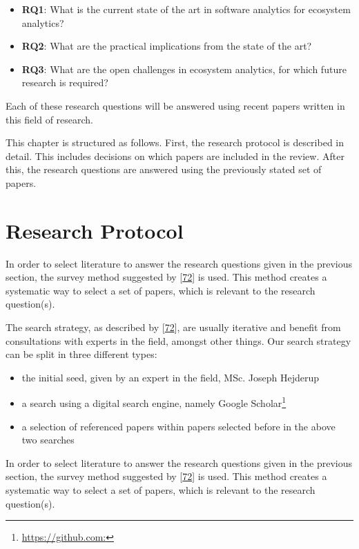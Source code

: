 \documentclass[]{book}
\providecommand{\tightlist}{%
  \setlength{\itemsep}{0pt}\setlength{\parskip}{0pt}}
\let\rmarkdownfootnote\footnote%
\def\footnote{\protect\rmarkdownfootnote}
\begin{document}
\begin{itemize}
\tightlist
\item
  \textbf{RQ1}: What is the current state of the art in software
  analytics for ecosystem analytics?
\item
  \textbf{RQ2}: What are the practical implications from the state of
  the art?
\item
  \textbf{RQ3}: What are the open challenges in ecosystem analytics, for
  which future research is required?
\end{itemize}

Each of these research questions will be answered using recent papers
written in this field of research.

This chapter is structured as follows. First, the research protocol is
described in detail. This includes decisions on which papers are
included in the review. After this, the research questions are answered
using the previously stated set of papers.

\section{Research Protocol}\label{research-protocol-2}

In order to select literature to answer the research questions given in
the previous section, the survey method suggested by
{[}\protect\hyperlink{ref-Kitchenham2004}{72}{]} is used. This method
creates a systematic way to select a set of papers, which is relevant to
the research question(s).

The search strategy, as described by
{[}\protect\hyperlink{ref-Kitchenham2004}{72}{]}, are usually iterative
and benefit from consultations with experts in the field, amongst other
things. Our search strategy can be split in three different types:

\begin{itemize}
\tightlist
\item
  the initial seed, given by an expert in the field, MSc. Joseph
  Hejderup
\item
  a search using a digital search engine, namely Google
  Scholar\footnote{\url{https://github.com:}}
\item
  a selection of referenced papers within papers selected before in the
  above two searches
\end{itemize}

In order to select literature to answer the research questions given in
the previous section, the survey method suggested by
{[}\protect\hyperlink{ref-Kitchenham2004}{72}{]} is used. This method
creates a systematic way to select a set of papers, which is relevant to
the research question(s).
\end{document}
